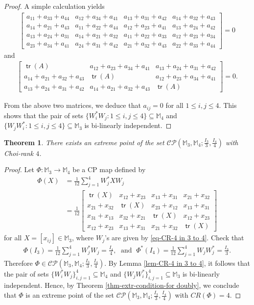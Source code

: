 \documentclass[10pt,reqno]{amsart}
\theoremstyle{definition}
\theoremstyle{plain}
\newtheorem{thm}[defn]{Theorem}
\theoremstyle{remark}
\renewcommand{\sf}[1]{\textsf{#1}}
\newcommand{\mbb}[1]{\mathbb{#1}}
\newcommand{\msc}[1]{\mathscr{#1}}
\newcommand{\M}[1]{\mbb{M}_{#1}}%
\newcommand{\Matrix}[1]{\begin{bmatrix}#1\end{bmatrix}}
\DeclareMathOperator{\tr}{\sf{tr}}
\numberwithin{equation}{section}%
\begin{document}
\begin{proof}
	
	A simple calculation yields
	\begin{align*}
		\Matrix{a_{11}+a_{33}+a_{44}&a_{12}+a_{34}+a_{41}&a_{13}+a_{31}+a_{42}&a_{14}+a_{32}+a_{43}\\a_{14}+a_{21}+a_{43}&a_{11}+a_{22}+a_{44}&a_{12}+a_{23}+a_{41}&a_{13}+a_{24}+a_{42}\\a_{13}+a_{24}+a_{31}&a_{14}+a_{21}+a_{32}&a_{11}+a_{22}+a_{33}&a_{12}+a_{23}+a_{34}\\a_{23}+a_{34}+a_{41}&a_{24}+a_{31}+a_{42}&a_{21}+a_{32}+a_{43}&a_{22}+a_{33}+a_{44}}=0
	\end{align*}
	and
	\begin{align*}
		\Matrix{\tr(A)&a_{12}+a_{23}+a_{34}+a_{41}&a_{13}+a_{24}+a_{31}+a_{42}\\a_{14}+a_{21}+a_{32}+a_{43}&\tr(A)&a_{12}+a_{23}+a_{34}+a_{41}\\a_{13}+a_{24}+a_{31}+a_{42}&a_{14}+a_{21}+a_{32}+a_{43}&\tr(A)}=0.
	\end{align*}
	
	
	From the above two matrices, we deduce that $a_{ij}=0$ for all $1\leq i,j\leq 4$. This shows that the pair of sets $\{W_i^*W_j:1\leq i,j\leq 4\}\subseteq\M{4}$ and $\{W_jW_i^*:1\leq i,j\leq 4\}\subseteq\M{3}$ is bi-linearly independent.
\end{proof}



\begin{thm}\label{thm-CR 4- from 3 to 4}
	There exists an extreme point of the set $\msc{CP}(\M{3},\M{4}; \frac{I_{3}}{3},\frac{I_{4}}{4})$ with Choi-rank $4$.
\end{thm}



\begin{proof}
	Let $\Phi:\M{3}\to\M{4}$ be a CP map defined by
	\begin{align*}
		\Phi(X)
		&=\frac{1}{12}\sum_{j=1}^{4}W_j^*XW_j\\
		&=\frac{1}{12}\Matrix{\tr(X)&x_{12}+x_{23}&x_{13}+x_{31}&x_{21}+x_{32}\\x_{21}+x_{32}&\tr(X)&x_{23}+x_{12}&x_{13}+x_{31}\\x_{31}+x_{13}&x_{32}+x_{21}&\tr(X)&x_{12}+x_{23}\\x_{12}+x_{23}&x_{13}+x_{31}&x_{21}+x_{32}&\tr(X)}
	\end{align*}
	for all $X=[x_{ij}]\in\M{3}$, where $W_j$'s are given by \eqref{eq-CR-4 in 3 to 4}. Check that
	\begin{align*}
		\Phi(I_3)=\frac{1}{12}\sum_{j=1}^4W_j^*W_j=\frac{I_{4}}{4},\; \text{ and }\; \Phi^*(I_4)=\frac{1}{12}\sum_{j=1}^4W_jW_j^*=\frac{I_3}{3}.
	\end{align*}
	Therefore $\Phi\in\msc{CP}(\M{3},\M{4}; \frac{I_{3}}{3},\frac{I_{4}}{4})$. By Lemma \ref{lem-CR-4 in 3 to 4}, it follows that the pair of sets $\{W_i^*W_j\}_{i,j=1}^4\subseteq\M{4}$ and $\{W_jW_i^*\}_{i,j=1}^4\subseteq\M{3}$ is bi-linearly independent. Hence, by Theorem \ref{thm-extr-condition-for doubly}, we conclude that $\Phi$ is an extreme point of the set $\msc{CP}(\M{3},\M{4}; \frac{I_{3}}{3},\frac{I_{4}}{4})$ with  $CR(\Phi)=4$.
\end{proof}
\end{document}
